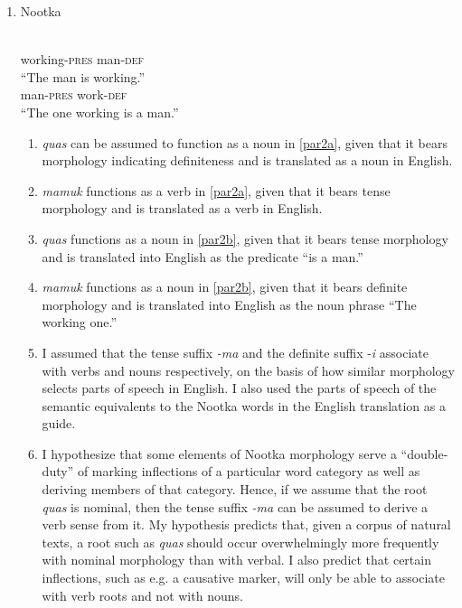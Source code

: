 \documentclass[12pt]{article}
\begin{document}
\begin{enumerate}
\item Nootka

\begin{exe}
  \ex\label{par2} %
  \begin{xlist} %
    \ex\label{par2a} \\
    working-\textsc{pres} man-\textsc{def}\\
    ``The man is working.''
    \ex\label{par2b} \\
    man-\textsc{pres} work-\textsc{def}\\
    ``The one working is a man.''
  \end{xlist}
\end{exe}

\begin{enumerate}
\item \emph{quas} can be assumed to function as a noun in \ref{par2a}, given that it bears morphology indicating definiteness and is translated as a noun in English.

\item \emph{mamu\textipa{:}k} functions as a verb in \ref{par2a}, given that it bears tense morphology and is translated as a verb in English.

\item \emph{quas} functions as a noun in \ref{par2b}, given that it bears tense morphology and is translated into English as the predicate ``is a man.''

\item \emph{mamu\textipa{:}k} functions as a noun in \ref{par2b}, given that it bears definite morphology and is translated into English as the noun phrase ``The working one.''

\item I assumed that the tense suffix \emph{-ma} and the definite suffix -\emph{i} associate with verbs and nouns respectively, on the basis of how similar morphology selects parts of speech in English. I also used the parts of speech of the semantic equivalents to the Nootka words in the English translation as a guide.

\item I hypothesize that some elements of Nootka morphology serve a ``double-duty'' of marking inflections of a particular word category as well as deriving members of that category. Hence, if we assume that the root \emph{quas} is nominal, then the tense suffix \emph{-ma} can be assumed to derive a verb sense from it. My hypothesis predicts that, given a corpus of natural texts, a root such as \emph{quas} should occur overwhelmingly more frequently with nominal morphology than with verbal. I also predict that certain inflections, such as e.g. a causative marker, will only be able to associate with verb roots and not with nouns.


\end{enumerate}
\end{enumerate}
\end{document}
